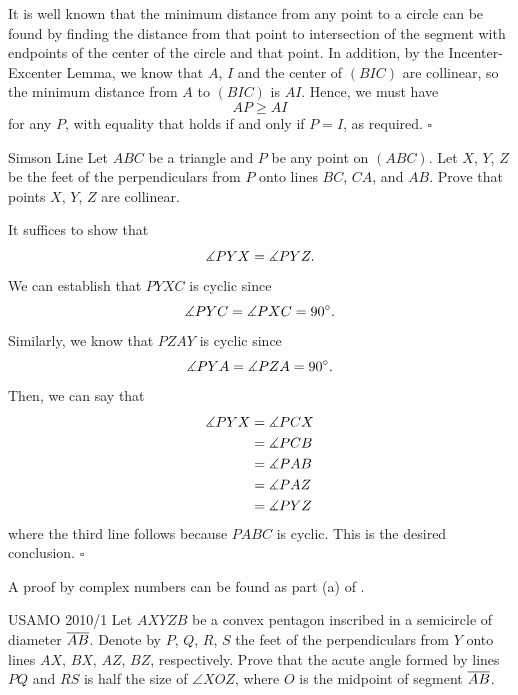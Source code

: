 \documentclass{article}
\begin{document}
It is well known that the minimum distance from any point to a circle can be found by finding the distance from that point to intersection of the segment with endpoints of the center of the circle and that point. In addition, by the Incenter-Excenter Lemma, we know that $A$, $I$ and the center of $(BIC)$ are collinear, so the minimum distance from $A$ to $(BIC)$ is $AI$. Hence, we must have \[AP \ge AI\] for any $P$, with equality that holds if and only if $P = I$, as required. $\square$

\begin{problem}[1.48]{Simson Line}
Let $ABC$ be a triangle and $P$ be any point on $(ABC)$. Let $X$, $Y$, $Z$ be the feet of the perpendiculars from $P$ onto lines $BC$, $CA$, and $AB$. Prove that points $X$, $Y$, $Z$ are collinear.
\end{problem}

It suffices to show that \[\measuredangle PYX = \measuredangle PYZ.\] We can establish that $PYXC$ is cyclic since \[\measuredangle PYC = \measuredangle PXC = 90^\circ.\] Similarly, we know that $PZAY$ is cyclic since \[\measuredangle PYA = \measuredangle PZA = 90^\circ.\] Then, we can say that 
\begin{align*}
\measuredangle PYX &= \measuredangle PCX \\
&= \measuredangle PCB \\
&= \measuredangle PAB \\
&= \measuredangle PAZ \\
&= \measuredangle PYZ
\end{align*}
where the third line follows because $PABC$ is cyclic. This is the desired conclusion. $\square$

\begin{remark*}
A proof by complex numbers can be found as part (a) of .
\end{remark*}

\begin{problem}[1.49]{USAMO 2010/1}
Let $AXYZB$ be a convex pentagon inscribed in a semicircle of diameter $\overline{AB}$. Denote by $P$, $Q$, $R$, $S$ the feet of the perpendiculars from $Y$ onto lines $AX$, $BX$, $AZ$, $BZ$, respectively. Prove that the acute angle formed by lines $PQ$ and $RS$ is half the size of $\angle XOZ$, where $O$ is the midpoint of segment $\overline{AB}$.
\end{problem}
\end{document}
